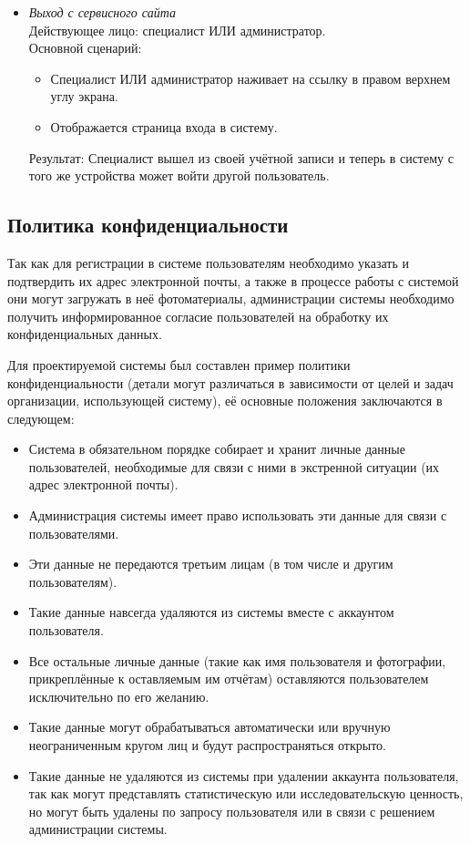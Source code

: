 \begin{itemize}[topsep=0pt, parsep=0pt, itemsep=0pt, leftmargin=*, labelindent=0.5cm]
	\item \textit{Выход с сервисного сайта} \\
	Действующее лицо: специалист ИЛИ администратор. \\
	Основной сценарий:
	\begin{itemize}[topsep=0pt, parsep=0pt, itemsep=0pt, leftmargin=*, labelindent=0.5cm]
		\item Специалист ИЛИ администратор наживает на ссылку  в правом верхнем углу экрана.
		\item Отображается страница входа в систему.
	\end{itemize}
	Результат: Специалист вышел из своей учётной записи и теперь в систему с того же устройства может войти другой пользователь.
\end{itemize}

\subsection{Политика конфиденциальности}

\tab
Так как для регистрации в системе пользователям необходимо указать и подтвердить их адрес электронной почты, а также в процессе работы с системой они могут загружать в неё фотоматериалы, администрации системы необходимо получить информированное согласие пользователей на обработку их конфиденциальных данных\cite{privacy-policy}.

\tab
Для проектируемой системы был составлен пример политики конфиденциальности (детали могут различаться в зависимости от целей и задач организации, использующей систему), её основные положения заключаются в следующем:
\begin{itemize}
	\item Система в обязательном порядке собирает и хранит личные данные пользователей, необходимые для связи с ними в экстренной ситуации (их адрес электронной почты).
	\item Администрация системы имеет право использовать эти данные для связи с пользователями.
	\item Эти данные не передаются третьим лицам (в том числе и другим пользователям).
	\item Такие данные навсегда удаляются из системы вместе с аккаунтом пользователя.
	\item Все остальные личные данные (такие как имя пользователя и фотографии, прикреплённые к оставляемым им отчётам) оставляются пользователем исключительно по его желанию.
	\item Такие данные могут обрабатываться автоматически или вручную неограниченным кругом лиц и будут распространяться открыто.
	\item Такие данные не удаляются из системы при удалении аккаунта пользователя, так как могут представлять статистическую или исследовательскую ценность, но могут быть удалены по запросу пользователя или в связи с решением администрации системы.
\end{itemize}

